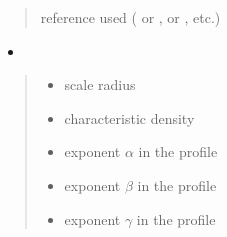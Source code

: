 \documentclass[letterpaper,10pt,english]{sphinxmanual}
\begin{document}
\begin{fulllineitems}
\begin{itemize}
\end{itemize}
\begin{quote}\begin{description}
\sphinxAtStartPar
{} \textendash{} reference used ( or \sphinxcode{\sphinxupquote{\textquotesingle{}1309.2641\textquotesingle{}}},  or \sphinxcode{\sphinxupquote{\textquotesingle{}1408.0002\textquotesingle{}}}, etc.)

\end{description}\end{quote}
\begin{itemize}
\item {} 
\sphinxAtStartPar
{}

\end{itemize}
\begin{quote}\begin{description}
\begin{itemize}
\item {} 
\sphinxAtStartPar
{} \textendash{} scale radius

\item {} 
\sphinxAtStartPar
{} \textendash{} characteristic density

\item {} 
\sphinxAtStartPar
{} \textendash{} exponent \(\alpha\) in the {\hyperref[\detokenize{diffsph.profiles:diffsph.profiles.templates.hdz}]{}} profile

\item {} 
\sphinxAtStartPar
{} \textendash{} exponent \(\beta\) in the {\hyperref[\detokenize{diffsph.profiles:diffsph.profiles.templates.hdz}]{}} profile

\item {} 
\sphinxAtStartPar
{} \textendash{} exponent \(\gamma\) in the {\hyperref[\detokenize{diffsph.profiles:diffsph.profiles.templates.hdz}]{}} profile


\end{itemize}
\end{description}
\end{quote}
\end{fulllineitems}
\end{document}
